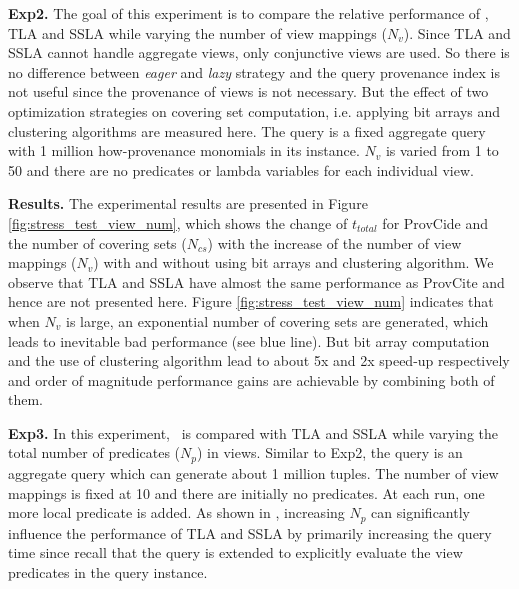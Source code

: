 \textbf{Exp2.} The goal of this experiment is to compare the relative performance of \provalg, TLA and SSLA while varying the number of view mappings ($N_v$). Since TLA and SSLA cannot handle aggregate views, only conjunctive views are used. So there is no difference between {\em eager} and {\em lazy} strategy and the query provenance index is not useful since the provenance of views is not necessary. But the effect of two optimization strategies on covering set computation, i.e. applying bit arrays and clustering algorithms are measured here. The query is a fixed aggregate query with 1 million how-provenance monomials in its instance. $N_v$ is varied from 1 to 50 and there are no predicates or lambda variables for each individual view. 

\textbf{Results.}
The experimental results are presented in Figure \ref{fig:stress_test_view_num}, which shows the change of $t_{total}$ for ProvCide and the number of covering sets ($N_{cs}$) with the increase of the number of view mappings ($N_v$) with and without using bit arrays and clustering algorithm. We observe that TLA and SSLA have almost the same performance as ProvCite and hence are not presented here. Figure \ref{fig:stress_test_view_num} indicates that when $N_v$ is large, an exponential number of covering sets are generated, which leads to inevitable bad performance (see blue line). But bit array computation and the use of clustering algorithm lead to about 5x and 2x speed-up respectively and order of magnitude performance gains are achievable by combining both of them.


\textbf{Exp3.} In this experiment, \provalg\ is compared with TLA and SSLA while varying the total number of predicates ($N_p$) in views. Similar to Exp2, the query is an aggregate query which can generate about 1 million tuples. The number of view mappings is fixed at 10 and there are initially no predicates. At each run, one more local predicate is added. As shown in \cite{wu2018data}, increasing $N_p$ can significantly influence the performance of TLA and SSLA by primarily increasing the query time since recall that the query is extended to explicitly evaluate the view predicates in the query instance.

